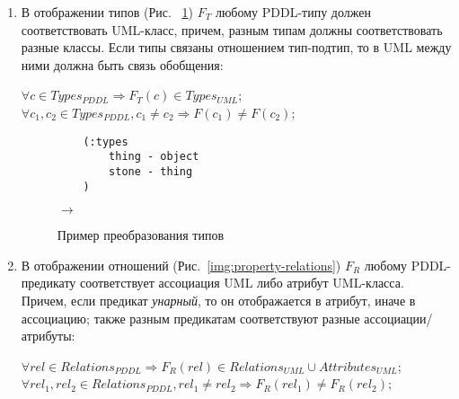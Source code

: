     \begin{enumerate}
        \item В отображении типов (Рис.
~\ref{img:property-types}) $F_T$ любому PDDL-типу должен соответствовать UML-класс, причем, разным типам должны соответствовать разные классы.
 Если типы связаны отношением тип-подтип, то в UML между ними должна быть связь обобщения:
    
        \begin{center}
            $\forall c \in Types_{PDDL} \Rightarrow F_T(c) \in Types_{UML}$; \\
            $\forall c_1, c_2 \in Types_{PDDL}, c_1 \neq c_2 \Rightarrow F(c_1) \neq F(c_2)$;
        \end{center}
                 
        
\begin{figure}[!h]
    \hfill
    \begin{minipage}[h]{0.40\linewidth}
        {\raggedright
        \begin{verbatim}
    (:types
        thing - object
        stone - thing
    )
        \end{verbatim} 
        }
    \end{minipage}
    \hfill
    $\rightarrow$
    \hfill
    \begin{minipage}[h]{0.45\linewidth}
    \end{minipage}
    \caption{Пример преобразования типов}
    \label{img:property-types}
\end{figure}
   

        \item В отображении отношений (Рис.~\ref{img:property-relations}) $F_R$ любому PDDL-предикату соответствует ассоциация UML либо атрибут UML-класса.
 Причем, если предикат \textit{унарный}, то он отображается в атрибут, иначе в ассоциацию; также разным предикатам соответствуют разные ассоциации/атрибуты:
    
        \begin{center}
        $\forall rel \in Relations_{PDDL} \Rightarrow F_R(rel) \in Relations_{UML} \cup Attributes_{UML}$;\\
        $\forall rel_1, rel_2 \in Relations_{PDDL}, rel_1 \neq rel_2 \Rightarrow F_R(rel_1) \neq F_R(rel_2)$; \\
        \end{center}


\end{enumerate}
